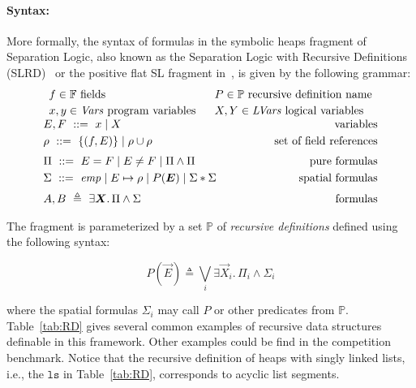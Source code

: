 \documentclass{llncs}
\newcommand{\sep}{.\,}
\newcommand{\posep}{*}
\newcommand{\points}{\mapsto}
\newcommand{\vars}{\mathit{Vars}}
\newcommand{\lvars}{\mathit{LVars}}
\newcommand{\pfields}{\mathbb{F}}
\newcommand{\preds}{\mathbb{P}}
\newcommand{\ls}{\mathtt{ls}}
\begin{document}
\paragraph{Syntax:}
More formally, the syntax of formulas in the symbolic heaps fragment of Separation Logic,
also known as the Separation Logic with Recursive Definitions (SLRD)~\cite{IosifRS13} or
the positive flat SL fragment in~\cite{AntonopoulosGHKO14}, 
is given by the following grammar:
$$
\begin{array}{c}
\begin{array}{ll}
f \in \pfields \mbox{ fields} ~&~
P \in \preds \mbox{ recursive definition name}
\\[0.8mm]
x,y \in \vars \mbox{ program variables} ~&~
X,Y \in \lvars \mbox{ logical variables}
\end{array}
\\[2mm]
%
%
E,F\ ::=\ x \mid X 
\hfill \mbox{variables}
\\[1mm]
\rho\ ::=\ \{ (f,E) \} \mid \rho\cup\rho 
\hfill \mbox{set of field references}
\\[2mm]
%
\Pi\ ::=\ E = F \mid E \neq F \mid \Pi \land \Pi \hfill 
\mbox{pure formulas}\\[1mm]
%
\Sigma\ ::=\
\mathit{emp} \mid
E \points \rho \mid 
P(\vec{E}) \mid 
\Sigma \posep \Sigma 
%
\hspace{1cm}\hfill \mbox{spatial formulas}
\\[2mm]
A,B\ \triangleq\ \exists \vec{X}\sep \Pi\land\Sigma \hfill \mbox{formulas} %
\end{array}
$$

The fragment is parameterized by a set $\preds$ of
\emph{recursive definitions} defined using the following syntax:

\begin{equation}\label{eq:RD}
P(\vec{E}) \triangleq \bigvee_i \exists \vec{X}_i\sep \Pi_i \land \Sigma_i
\end{equation}

where the spatial formulas $\Sigma_i$ may call $P$ or other predicates from $\preds$.
Table~\ref{tab:RD} gives several common examples of recursive data structures definable in this framework. Other examples could be find in the competition benchmark.
%
Notice that the recursive definition of heaps with singly linked lists, i.e., the $\ls$ in Table~\ref{tab:RD},
corresponds to acyclic list segments.
\end{document}
